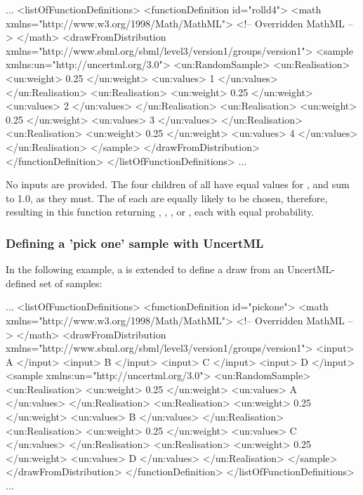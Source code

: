 \documentclass[draftspec]{sbmlpkgspec}
\begin{document}
\begin{example}
...
  <listOfFunctionDefinitions>
    <functionDefinition id="rolld4">
      <math xmlns="http://www.w3.org/1998/Math/MathML">
        <!-- Overridden MathML -->
      </math>
      <drawFromDistribution xmlns="http://www.sbml.org/sbml/level3/version1/groups/version1">
         <sample xmlns:un="http://uncertml.org/3.0">
           <un:RandomSample>
             <un:Realisation>
               <un:weight> 0.25 </un:weight>
               <un:values> 1 </un:values>
             </un:Realisation>
             <un:Realisation>
               <un:weight> 0.25 </un:weight>
               <un:values> 2 </un:values>
             </un:Realisation>
             <un:Realisation>
               <un:weight> 0.25 </un:weight>
               <un:values> 3 </un:values>
             </un:Realisation>
             <un:Realisation>
               <un:weight> 0.25 </un:weight>
               <un:values> 4 </un:values>
             </un:Realisation>
         </sample>
      </drawFromDistribution>
    </functionDefinition>
  </listOfFunctionDefinitions>
...
\end{example}

No inputs are provided.  The four  children of  all have equal values for , and sum to 1.0, as they must.  The  of each are equally likely to be chosen, therefore, resulting in this function returning , , , or , each with equal probability.



\subsubsection{Defining a 'pick one' sample with UncertML}
In the following example, a \FunctionDefinition is extended to define a draw from an UncertML-defined set of samples:

\begin{example}
...
  <listOfFunctionDefinitions>
    <functionDefinition id="pickone">
      <math xmlns="http://www.w3.org/1998/Math/MathML">
        <!-- Overridden MathML -->
      </math>
      <drawFromDistribution xmlns="http://www.sbml.org/sbml/level3/version1/groups/version1">
         <input> A </input>
         <input> B </input>
         <input> C </input>
         <input> D </input>
         <sample xmlns:un="http://uncertml.org/3.0">
           <un:RandomSample>
             <un:Realisation>
               <un:weight> 0.25 </un:weight>
               <un:values> A </un:values>
             </un:Realisation>
             <un:Realisation>
               <un:weight> 0.25 </un:weight>
               <un:values> B </un:values>
             </un:Realisation>
             <un:Realisation>
               <un:weight> 0.25 </un:weight>
               <un:values> C </un:values>
             </un:Realisation>
             <un:Realisation>
               <un:weight> 0.25 </un:weight>
               <un:values> D </un:values>
             </un:Realisation>
         </sample>
      </drawFromDistribution>
    </functionDefinition>
  </listOfFunctionDefinitions>
...
\end{example}
\end{document}
